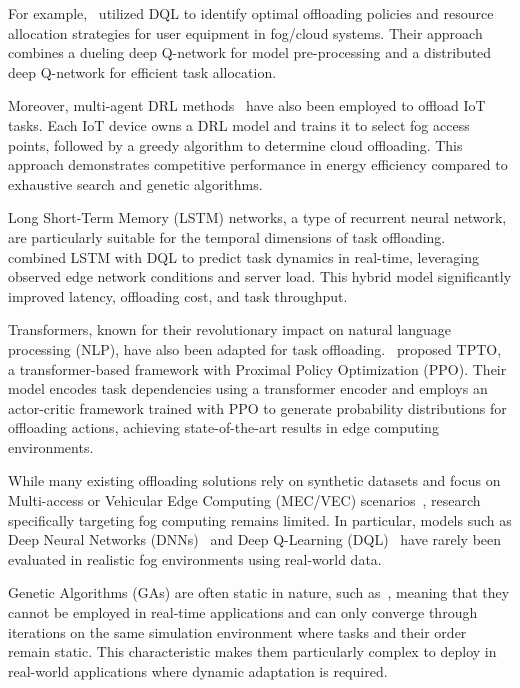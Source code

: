 \documentclass[preprint,3p,authoryear]{elsarticle}
\begin{document}
For example,~\cite{jiang_reinforcement_2021} utilized DQL to identify optimal offloading policies and resource allocation strategies for user equipment in fog/cloud systems. Their approach combines a dueling deep Q-network for model pre-processing and a distributed deep Q-network for efficient task allocation.

Moreover, multi-agent DRL methods~\citep{ren_deep_2021} have also been employed to offload IoT tasks. Each IoT device owns a DRL model and trains it to select fog access points, followed by a greedy algorithm to determine cloud offloading. This approach demonstrates competitive performance in energy efficiency compared to exhaustive search and genetic algorithms.

Long Short-Term Memory (LSTM) networks, a type of recurrent neural network, are particularly suitable for the temporal dimensions of task offloading.~\cite{tu_task_2022} combined LSTM with DQL to predict task dynamics in real-time, leveraging observed edge network conditions and server load. This hybrid model significantly improved latency, offloading cost, and task throughput.

Transformers, known for their revolutionary impact on natural language processing (NLP), have also been adapted for task offloading.~\cite{gholipour_tpto_2023} proposed TPTO, a transformer-based framework with Proximal Policy Optimization (PPO). Their model encodes task dependencies using a transformer encoder and employs an actor-critic framework trained with PPO to generate probability distributions for offloading actions, achieving state-of-the-art results in edge computing environments.

While many existing offloading solutions rely on synthetic datasets and focus on Multi-access or Vehicular Edge Computing (MEC/VEC) scenarios~\citep{fahimullah_review_2022, tu_task_2022, gholipour_tpto_2023}, research specifically targeting fog computing remains limited. In particular, models such as Deep Neural Networks (DNNs)~\citep{sarkar_deep_2022} and Deep Q-Learning (DQL)~\citep{jiang_reinforcement_2021} have rarely been evaluated in realistic fog environments using real-world data.

Genetic Algorithms (GAs) are often static in nature, such as~\citet{bernard_d-npga_2024, pakmehr_etfc_2024}, meaning that they cannot be employed in real-time applications and can only converge through iterations on the same simulation environment where tasks and their order remain static. This characteristic makes them particularly complex to deploy in real-world applications where dynamic adaptation is required.
\end{document}
